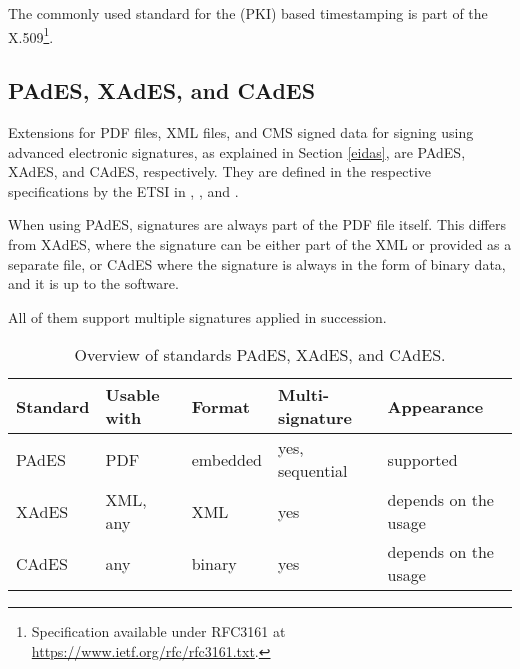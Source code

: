 \documentclass[thesismargins, english, thesislinespacing, onelinechapterstyle, upjsfrontpage]{rnthesis}
\begin{document}

The commonly used standard for the  (PKI) based timestamping is part of the X.509\footnote{Specification available under RFC3161 at \url{https://www.ietf.org/rfc/rfc3161.txt}.}.

\subsection{PAdES, XAdES, and CAdES}

Extensions for PDF files, XML files, and CMS signed data for signing using advanced electronic signatures, as explained in Section \ref{eidas}, are PAdES, XAdES, and CAdES, respectively.
They are defined in the respective specifications by the ETSI in \cite{pades}, \cite{xades}, and \cite{cades}.

When using PAdES, signatures are always part of the PDF file itself.
This differs from XAdES, where the signature can be either part of the XML or provided as a separate file, or CAdES where the signature is always in the form of binary data, and it is up to the software.

All of them support multiple signatures applied in succession.
\iffalse %
Implementation of the PAdES is rather portable since any compatible PDF file reader or editor will work with the signatures in a similar way - signature created in one should be easily verifiable in any other. XAdES and CAdES, however, are usually tied to specific implementation or standard that is built on top of them.
\fi

\begin{table}[h!]
  \begin{tabular}{ |p{2cm}||p{2.2cm}|p{2cm}|p{3cm}|p{3.9cm}| }
    \hline
    Standard & Usable with & Format & Multi-signature & Appearance \\
    \hline
    PAdES & PDF                  & embedded         & yes, sequential    & supported            \\
    XAdES & XML, any             & XML              & yes                & depends on the usage \\
    CAdES & any                  & binary           & yes                & depends on the usage \\
    \hline
  \end{tabular}

  \caption{Overview of standards PAdES, XAdES, and CAdES.}
  \label{table:1}
\end{table}
\end{document}
